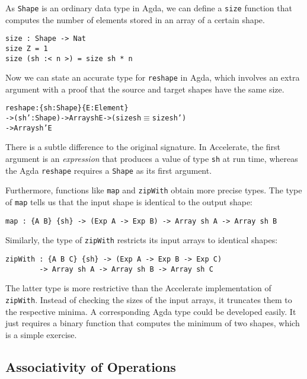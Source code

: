 \documentclass{llncs}
\begin{document}
As \texttt{Shape} is an ordinary data type in Agda, we can define a
\texttt{size} function that computes the number of elements stored in
an array of a certain shape.
\begin{verbatim}
size : Shape -> Nat
size Z = 1
size (sh :< n >) = size sh * n
\end{verbatim}
Now we can state an accurate type for \texttt{reshape} in Agda, which
involves an extra argument with a proof that the source and
target shapes have the same size.
\begin{alltt}
reshape : \{sh : Shape\} \{E : Element\}
       -> (sh' : Shape) -> Array sh E -> (size sh \(\equiv\) size sh')
       -> Array sh' E
\end{alltt}
There is a subtle difference to the original signature. In
Accelerate, the first argument is an \emph{expression} that produces a
value of type \texttt{sh} at run time, whereas the Agda
\texttt{reshape} requires a \texttt{Shape} as its first argument.


Furthermore, functions like \texttt{map} and \texttt{zipWith} obtain
more precise types. The type of \texttt{map} tells us that the input
shape is identical to the output shape:
\begin{verbatim}
map : {A B} {sh} -> (Exp A -> Exp B) -> Array sh A -> Array sh B
\end{verbatim}
Similarly, the type of \texttt{zipWith} restricts its input arrays to
identical shapes:
\begin{verbatim}
zipWith : {A B C} {sh} -> (Exp A -> Exp B -> Exp C)
        -> Array sh A -> Array sh B -> Array sh C
\end{verbatim}
The latter type is more restrictive than the Accelerate
implementation of \texttt{zipWith}. Instead of checking the sizes
of the input arrays, it truncates them to the respective minima. A
corresponding Agda type could be developed easily. It just requires a
binary function that computes the minimum of two shapes, which is a
simple exercise.

\subsection{Associativity of Operations}
\label{sec:assoc-oper}
\end{document}
